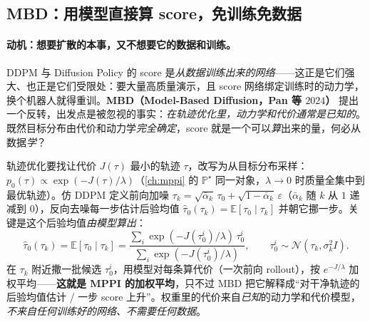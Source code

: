 \subsection{MBD：用模型直接算 score，免训练免数据}
\label{sec:mv-mbd}

\paragraph{动机：想要扩散的本事，又不想要它的数据和训练。}
DDPM 与 Diffusion Policy\cite{chi2023diffusion} 的 score 是\emph{从数据训练出来的网络}——这正是它们强大、也正是它们受限处：要大量高质量演示，且 score 网络绑定训练时的动力学，换个机器人就得重训。\textbf{MBD（Model-Based Diffusion，Pan 等 $2024$）}\cite{pan2024mbd} 提出一个反转，出发点是被忽视的事实：\emph{在轨迹优化里，动力学和代价通常是已知的}。既然目标分布由代价和动力学\emph{完全确定}，score 就是一个可以\emph{算}出来的量，何必从数据\emph{学}？

\begin{theorem}\label{thm:mv-mbd}
轨迹优化要找让代价 $J(\tau)$ 最小的轨迹 $\tau$，改写为从目标分布采样：$p_0(\tau)\propto\exp(-J(\tau)/\lambda)$（\cref{ch:mppi} 的 $\mathbb{P}^\star$ 同一对象，$\lambda\to0$ 时质量全集中到最优轨迹）。仿 DDPM 定义前向加噪 $\tau_k=\sqrt{\bar\alpha_k}\,\tau_0+\sqrt{1-\bar\alpha_k}\,\varepsilon$（$\bar\alpha_k$ 随 $k$ 从 $1$ 递减到 $0$），反向去噪每一步估计后验均值 $\hat\tau_0(\tau_k)=\mathbb{E}[\tau_0\mid\tau_k]$ 并朝它挪一步。关键是这个后验均值\emph{由模型算出}：
\begin{equation}
  \hat\tau_0(\tau_k)=\mathbb{E}[\tau_0\mid\tau_k]=\frac{\sum_i \exp(-J(\tau_0^i)/\lambda)\,\tau_0^i}{\sum_i \exp(-J(\tau_0^i)/\lambda)},\qquad \tau_0^i\sim\mathcal{N}(\tau_k,\sigma_k^2 I).
  \label{eq:mv-mbd-posterior}
\end{equation}
在 $\tau_k$ 附近撒一批候选 $\tau_0^i$，用模型对每条算代价（一次前向 rollout），按 $e^{-J/\lambda}$ 加权平均——\textbf{这就是 MPPI 的加权平均}，只不过 MBD 把它解释成“对干净轨迹的后验均值估计 / 一步 score 上升”。权重里的代价来自\emph{已知}的动力学和代价模型，\emph{不来自任何训练好的网络、不需要任何数据}\cite{pan2024mbd}。
\end{theorem}

